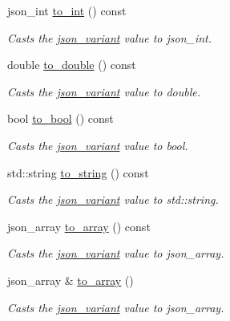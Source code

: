 \begin{DoxyCompactItemize}
json\+\_\+int \hyperlink{classJSONLIB__NAMESPACE_1_1json__variant_a8f30debf624e1a9d6cdc8aed8f7bda3d}{to\+\_\+int} () const
\begin{DoxyCompactList}\small\item\em Casts the \hyperlink{classJSONLIB__NAMESPACE_1_1json__variant}{json\+\_\+variant} value to {\itshape json\+\_\+int}. \end{DoxyCompactList}\item 
double \hyperlink{classJSONLIB__NAMESPACE_1_1json__variant_a9a5c7a9568e052b4a38d1b6107038d7b}{to\+\_\+double} () const
\begin{DoxyCompactList}\small\item\em Casts the \hyperlink{classJSONLIB__NAMESPACE_1_1json__variant}{json\+\_\+variant} value to {\itshape double}. \end{DoxyCompactList}\item 
bool \hyperlink{classJSONLIB__NAMESPACE_1_1json__variant_a7a675f60b84c0f8e6ee30aba7cb0b72c}{to\+\_\+bool} () const
\begin{DoxyCompactList}\small\item\em Casts the \hyperlink{classJSONLIB__NAMESPACE_1_1json__variant}{json\+\_\+variant} value to {\itshape bool}. \end{DoxyCompactList}\item 
std\+::string \hyperlink{classJSONLIB__NAMESPACE_1_1json__variant_a6bbb59173d134b69cded2d3da3a1b70f}{to\+\_\+string} () const
\begin{DoxyCompactList}\small\item\em Casts the \hyperlink{classJSONLIB__NAMESPACE_1_1json__variant}{json\+\_\+variant} value to {\itshape std\+::string}. \end{DoxyCompactList}\item 
json\+\_\+array \hyperlink{classJSONLIB__NAMESPACE_1_1json__variant_a9c7e9d81370ff98393d2fd3ee00d013a}{to\+\_\+array} () const
\begin{DoxyCompactList}\small\item\em Casts the \hyperlink{classJSONLIB__NAMESPACE_1_1json__variant}{json\+\_\+variant} value to {\itshape json\+\_\+array}. \end{DoxyCompactList}\item 
json\+\_\+array \& \hyperlink{classJSONLIB__NAMESPACE_1_1json__variant_a2af42a0f5c2fb4a8a74d2cae1166752a}{to\+\_\+array} ()
\begin{DoxyCompactList}\small\item\em Casts the \hyperlink{classJSONLIB__NAMESPACE_1_1json__variant}{json\+\_\+variant} value to {\itshape json\+\_\+array}. \end{DoxyCompactList}\item 

\end{DoxyCompactItemize}
